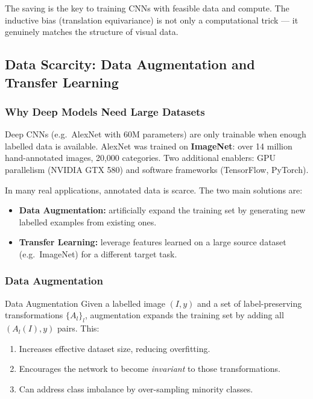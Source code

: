 \documentclass[11pt,a4paper]{article}
\begin{document}
The saving is the key to training CNNs with feasible data and compute. The inductive bias (translation equivariance) is not only a computational trick — it genuinely matches the structure of visual data.

\subsection{Data Scarcity: Data Augmentation and Transfer Learning}
\label{sec:data_scarcity}

\subsubsection{Why Deep Models Need Large Datasets}

Deep CNNs (e.g.\ AlexNet with 60M parameters) are only trainable when enough labelled data is available. AlexNet was trained on \textbf{ImageNet}: over 14 million hand-annotated images, 20,000 categories. Two additional enablers: GPU parallelism (NVIDIA GTX 580) and software frameworks (TensorFlow, PyTorch).

In many real applications, annotated data is scarce. The two main solutions are:
\begin{itemize}
  \item \textbf{Data Augmentation:} artificially expand the training set by generating new labelled examples from existing ones.
  \item \textbf{Transfer Learning:} leverage features learned on a large source dataset (e.g.\ ImageNet) for a different target task.
\end{itemize}

\subsubsection{Data Augmentation}
\label{sec:augmentation}

\begin{defbox}{Data Augmentation}
Given a labelled image $(I, y)$ and a set of label-preserving transformations $\{A_l\}_l$, augmentation expands the training set by adding all $(A_l(I), y)$ pairs. This:
\begin{enumerate}
  \item Increases effective dataset size, reducing overfitting.
  \item Encourages the network to become \emph{invariant} to those transformations.
  \item Can address class imbalance by over-sampling minority classes.
\end{enumerate}
\end{defbox}
\end{document}
